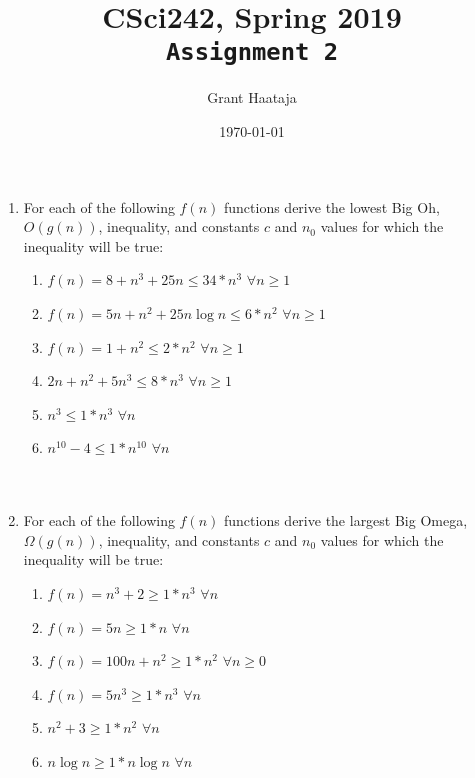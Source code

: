 \documentclass[11pt,final,twoside]{article} %
\title{CSci242, Spring 2019\\
	\texttt{Assignment 2}}
\author{Grant Haataja}
\date{\today}
\begin{document}
	\maketitle

\begin{enumerate}
	\item For each of the following $f(n)$ functions derive the lowest Big Oh, $O(g(n))$, inequality, and constants $c$ and $n_0$ values for which the inequality will be true:
	\begin{enumerate}
		\item $f(n) = 8 + n^3 + 25n \leq 34 * n^3$ $\forall n \geq 1$
		\item $f(n) = 5n + n^2 + 25n\log n \leq 6 * n^2$ $\forall n \geq 1$ 
		\item $f(n) = 1 + n^2 \leq 2 * n^2$ $\forall n \geq 1$ 
		\item $2n + n^2 + 5n^3 \leq 8 * n^3$ $\forall n \geq 1$ 
		\item $n^3 \leq 1 * n^3$ $\forall n$ 
		\item $n^{10} - 4 \leq 1 * n^{10} $ $\forall n$ \\\\\\	
	\end{enumerate}
	\item For each of the following $f(n)$ functions derive the largest Big Omega, $\Omega(g(n))$, inequality, and constants $c$ and $n_0$ values for which the inequality will be true:
	\begin{enumerate}
		\item $f(n) = n^3 + 2 \geq 1 * n^3$ $\forall n$ 
		\item $f(n) = 5n \geq 1 * n$ $\forall n$ 
		\item $f(n) = 100n + n^2 \geq 1 * n^2$ $\forall n \geq 0$ 
		\item $f(n) = 5n^3 \geq 1 * n^3$ $\forall n$ 
		\item $n^2 + 3 \geq 1 * n^2$ $\forall n$ 
		\item $n\log n \geq 1 * n\log n$ $ \forall n$ 
	\end{enumerate}
\end{enumerate}
	
\end{document}
